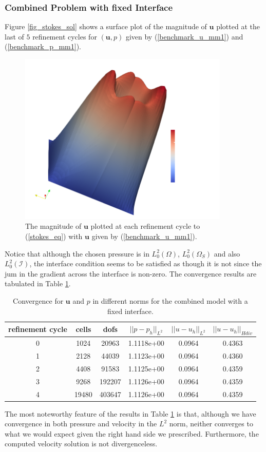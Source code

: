 \documentclass[12pt,a4paper]{article}
\theoremstyle{definition}
\begin{document}
\subsubsection{Combined Problem with fixed Interface}
Figure \ref{fig_stokes_sol}  shows a surface plot of the magnitude of $\textbf{u}$ plotted at the last of $5$ refinement cycles for $\left(\textbf{u}, p\right)$ given by (\ref{benchmark_u_mm1}) and (\ref{benchmark_p_mm1}).
\begin{figure}[H]
	\centering
	\includegraphics[width=10cm]{combi_u}
	\caption{The magnitude of $\textbf{u}$ plotted at each refinement cycle to (\ref{stokes_eq}) with $\textbf{u}$ given by (\ref{benchmark_u_mm1}).}
	\label{fig_combi_sol}
\end{figure}
Notice that although the chosen pressure is in  $L^2_0\left(\Omega\right)$, $L^2_0\left(\Omega_S\right)$ and also $L^2_0\left(\mathcal{I}\right)$, the interface condition seems to be satisfied as though it is not since the jum in the gradient across the interface is non-zero.  The convergence results are tabulated in Table \ref{tablebenchmark_convergence_mm1}.  
\begin{table}[H]
	\begin{center}
	\begin{tabular}{|c|c|c|c|c|c|} \hline
		refinement cycle & cells & dofs & $||p-p_h||_{L^2}$ & $||u-u_h||_{L^2}$ & $||u-u_h||_{Hdiv}$\\ \hline
		0 & 1024 & 20963 & 1.1118e+00 & 0.0964 & 0.4363\\ \hline
		1 & 2128 & 44039 & 1.1123e+00 & 0.0964 & 0.4360\\ \hline
		2 & 4408 & 91583 & 1.1125e+00 & 0.0964 & 0.4359\\ \hline
		3 & 9268 & 192207 & 1.1126e+00 & 0.0964 & 0.4359\\ \hline
		4 & 19480 & 403647 & 1.1126e+00 & 0.0964 & 0.4359\\ \hline
	\end{tabular}
		\caption{Convergence for $\textbf{u}$ and $p$ in different norms for the combined model with a fixed interface.}
		\label{tablebenchmark_convergence_mm1}
	\end{center}
\end{table}
The most noteworthy feature of the results in Table \ref{tablebenchmark_convergence_mm1} is that, although we have convergence in both pressure and velocity in the $L^2$ norm, neither converges to what we would expect given the right hand side we prescribed.  Furthermore, the computed velocity solution is not divergenceless.
\end{document}
